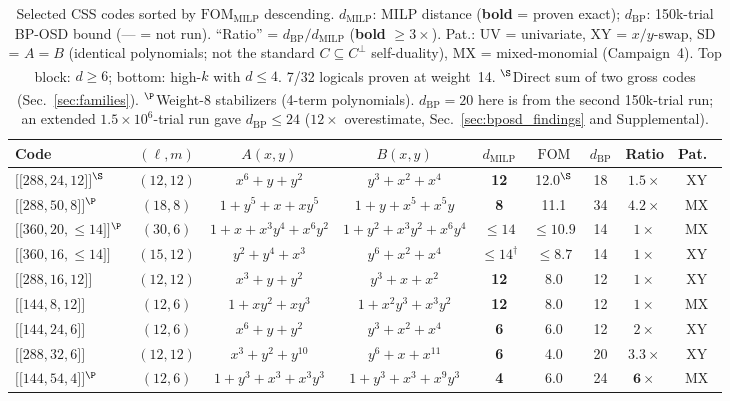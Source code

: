 \documentclass[aps,prxquantum,twocolumn,superscriptaddress,nofootinbib]{revtex4-2}
\newcommand{\dblbrk}[1]{\ensuremath{\lbrack\!\lbrack #1 \rbrack\!\rbrack}}
\newcommand{\code}[1]{\dblbrk{#1}}
\newcommand{\FOM}{\ensuremath{\mathrm{FOM}}}
\begin{document}
\begin{table}[t]
\centering
\caption{Selected CSS codes sorted by $\FOM_{\text{MILP}}$ descending.
$d_{\text{MILP}}$: MILP distance (\textbf{bold} = proven exact); $d_{\text{BP}}$: 150k-trial BP-OSD bound (--- = not run).
``Ratio'' = $d_{\text{BP}}/d_{\text{MILP}}$ (\textbf{bold} $\geq 3\times$).
Pat.: UV = univariate, XY = $x/y$-swap, SD = $A = B$ (identical polynomials; not the standard $C \subseteq C^\perp$ self-duality), MX = mixed-monomial (Campaign~4).
Top block: $d \geq 6$; bottom: high-$k$ with $d \leq 4$.
\textsuperscript{\dag}7/32 logicals proven at weight~14.
$^{\S}$Direct sum of two gross codes (Sec.~\ref{sec:families}).
$^{\P}$Weight-8 stabilizers (4-term polynomials).
\textsuperscript{\ddag}$d_{\text{BP}} = 20$ here is from the second 150k-trial run; an extended $1.5\times10^6$-trial run gave $d_{\text{BP}} \leq 24$ ($12\times$ overestimate, Sec.~\ref{sec:bposd_findings} and Supplemental).}
\label{tab:codes}
\small
\begin{tabular}{lcccccccc}
\toprule
Code & $(\ell,m)$ & $A(x,y)$ & $B(x,y)$ & $d_{\text{MILP}}$ & $\FOM$ & $d_{\text{BP}}$ & Ratio & Pat.\ \\
\midrule
$\code{288,24,12}$$^{\S}$ & $(12,12)$ & $x^6{+}y{+}y^2$ & $y^3{+}x^2{+}x^4$ & \textbf{12} & 12.0$^{\S}$ & 18 & $1.5\times$ & XY \\
$\code{288,50,8}$$^{\P}$ & $(18,8)$ & $1{+}y^5{+}x{+}xy^5$ & $1{+}y{+}x^5{+}x^5 y$ & \textbf{8} & 11.1 & 34 & $\mathbf{4.2\times}$ & MX \\
$\code{360,20,{\leq}14}$$^{\P}$ & $(30,6)$ & $1{+}x{+}x^3 y^4{+}x^6 y^2$ & $1{+}y^2{+}x^3 y^2{+}x^6 y^4$ & $\leq 14$ & $\leq 10.9$ & 14 & $1\times$ & MX \\
$\code{360,16,{\leq}14}$ & $(15,12)$ & $y^2{+}y^4{+}x^3$ & $y^6{+}x^2{+}x^4$ & $\leq 14^\dagger$ & ${\leq}8.7$ & 14 & $1\times$ & XY \\
$\code{288,16,12}$ & $(12,12)$ & $x^3{+}y{+}y^2$ & $y^3{+}x{+}x^2$ & \textbf{12} & 8.0 & 12 & $1\times$ & XY \\
$\code{144,8,12}$ & $(12,6)$ & $1{+}xy^2{+}xy^3$ & $1{+}x^2 y^3{+}x^3 y^2$ & \textbf{12} & 8.0 & 12 & $1\times$ & MX \\
$\code{144,24,6}$ & $(12,6)$ & $x^6{+}y{+}y^2$ & $y^3{+}x^2{+}x^4$ & \textbf{6} & 6.0 & 12 & $2\times$ & XY \\
$\code{288,32,6}$ & $(12,12)$ & $x^3{+}y^2{+}y^{10}$ & $y^6{+}x{+}x^{11}$ & \textbf{6} & 4.0 & 20 & $\mathbf{3.3\times}$ & XY \\
\midrule
$\code{144,54,4}$$^{\P}$ & $(12,6)$ & $1{+}y^3{+}x^3{+}x^3 y^3$ & $1{+}y^3{+}x^3{+}x^9 y^3$ & \textbf{4} & 6.0 & 24 & $\mathbf{6\times}$ & MX \\

\end{tabular}
\end{table}
\end{document}
